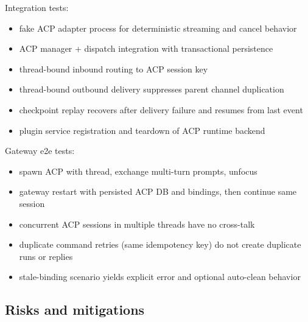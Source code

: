 Integration tests:

\begin{itemize}
  \item fake ACP adapter process for deterministic streaming and cancel behavior
  \item ACP manager + dispatch integration with transactional persistence
  \item thread-bound inbound routing to ACP session key
  \item thread-bound outbound delivery suppresses parent channel duplication
  \item checkpoint replay recovers after delivery failure and resumes from last event
  \item plugin service registration and teardown of ACP runtime backend
\end{itemize}


Gateway e2e tests:

\begin{itemize}
  \item spawn ACP with thread, exchange multi-turn prompts, unfocus
  \item gateway restart with persisted ACP DB and bindings, then continue same session
  \item concurrent ACP sessions in multiple threads have no cross-talk
  \item duplicate command retries (same idempotency key) do not create duplicate runs or replies
  \item stale-binding scenario yields explicit error and optional auto-clean behavior
\end{itemize}


\subsection{Risks and mitigations}



